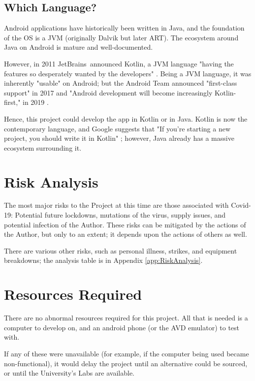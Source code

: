 \documentclass[11pt, a4paper, notitlepage]{report}
\begin{document}
\subsection{Which Language?}
Android applications have historically been written in Java, and the foundation 
of the OS is a JVM (originally Dalvik but later ART). The ecosystem around Java 
on Android is mature and well-documented.

However, in 2011 JetBrains\texttrademark\ announced Kotlin, a JVM language 
"having the features so desperately wanted by the developers" \citep{KotlinAnnounced}. Being a JVM language, it was inherently "usable" on Android; but the Android Team announced "first-class support" in 2017 \citep{KotlinPreferred} and "Android development will become increasingly Kotlin-first," in 2019 \citep{KotlinFirst}.

Hence, this project could develop the app in Kotlin or in Java. Kotlin is now 
the contemporary language, and Google suggests that "If you’re starting a new 
project, you should write it in Kotlin" \citep{KotlinFirst}; however, Java already has a massive ecosystem surrounding it.

\section{Risk Analysis}
The most major risks to the Project at this time are those associated with 
Covid-19: Potential future lockdowns, mutations of the virus, supply issues, 
and potential infection of the Author. These risks can be mitigated by the 
actions of the Author, but only to an extent; it depends upon the actions of 
others as well.

There are various other risks, such as personal illness, strikes, and equipment 
breakdowns; the analysis table is in Appendix \ref{app:RiskAnalysis}.

\section{Resources Required}
There are no abnormal resources required for this project. All that is needed 
is a computer to develop on, and an android phone (or the AVD emulator) to test 
with.

If any of these were unavailable (for example, if the computer being used 
became non-functional), it would delay the project until an alternative could 
be sourced, or until the University's Labs are available.
\end{document}
